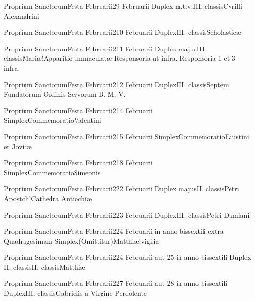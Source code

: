 \documentclass[liber-responsorialis_hiemalis.tex]{subfiles}
\begin{document}
	{Proprium Sanctorum}{Festa Februarii}{2}{9 Februarii}
	{Duplex m.t.v.}{III. classis}{Cyrilli Alexandrini}
	{\copodorubric}
	{\respdetemp}

	{Proprium Sanctorum}{Festa Februarii}{2}{10 Februarii}
	{Duplex}{III. classis}{Scholasticæ}
	{\vnrubric}
	{\respdetemp}

	{Proprium Sanctorum}{Festa Februarii}{2}{11 Februarii}
	{Duplex majus}{III. classis}{Mariæ!Apparitio Immaculatæ}
	{Responsoria ut infra.}
	{Responsoria 1 et 3 infra.}

	{Proprium Sanctorum}{Festa Februarii}{2}{12 Februarii}
	{Duplex}{III. classis}{Septem Fundatorum Ordinis Servorum B. M. V.}
	{\conprubric}
	{\respdetemp}

	{Proprium Sanctorum}{Festa Februarii}{2}{14 Februarii}
	{Simplex}{Commemoratio}{Valentini}
	{}
	{}
\rubric{\respdetemp}

	{Proprium Sanctorum}{Festa Februarii}{2}{15 Februarii}
	{Simplex}{Commemoratio}{Faustini et Jovitæ}
	{}
	{}
\rubric{\respdetemp}

	{Proprium Sanctorum}{Festa Februarii}{2}{18 Februarii}
	{Simplex}{Commemoratio}{Simeonis}
	{}
	{}
\rubric{\respdetemp}

	{Proprium Sanctorum}{Festa Februarii}{2}{22 Februarii}
	{Duplex majus}{II. classis}{Petri Apostoli!Cathedra Antiochiæ}
	{}
	{}

	{Proprium Sanctorum}{Festa Februarii}{2}{23 Februarii}
	{Duplex}{III. classis}{Petri Damiani}
	{\copodorubric}
	{\respdetemp}

	{Proprium Sanctorum}{Festa Februarii}{2}{24 Februarii in anno bissextili extra Quadragesimam}
	{Simplex}{(Omittitur)}{Matthiæ!vigilia}
	{}
	{}
\rubric{\respdetemp}

	{Proprium Sanctorum}{Festa Februarii}{2}{24 Februarii aut 25 in anno bissextili}
	{Duplex II. classis}{II. classis}{Matthiæ}
	{}
	{}
\rubric{\apexrubric}

	{Proprium Sanctorum}{Festa Februarii}{2}{27 Februarii aut 28 in anno bissextili}
	{Duplex}{III. classis}{Gabrielis a Virgine Perdolente}
	{\conprubric}
	{\respdetemp}
\end{document}
